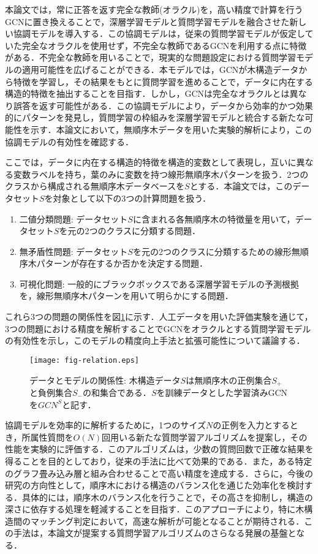 本論文では，常に正答を返す完全な教師(オラクル)を，高い精度で計算を行うGCNに置き換えることで，深層学習モデルと質問学習モデルを融合させた新しい協調モデルを導入する．この協調モデルは，従来の質問学習モデルが仮定していた完全なオラクルを使用せず，不完全な教師であるGCNを利用する点に特徴がある．不完全な教師を用いることで，現実的な問題設定における質問学習モデルの適用可能性を広げることができる．本モデルでは，GCNが木構造データから特徴を学習し，その結果をもとに質問学習を進めることで，データに内在する構造的特徴を抽出することを目指す．しかし，GCNは完全なオラクルとは異なり誤答を返す可能性がある．この協調モデルにより，データから効率的かつ効果的にパターンを発見し，質問学習の枠組みを深層学習モデルと統合する新たな可能性を示す．本論文において，無順序木データを用いた実験的解析により，この協調モデルの有効性を確認する．

ここでは，データに内在する構造的特徴を構造的変数として表現し，互いに異なる変数ラベルを持ち，葉のみに変数を持つ線形無順序木パターンを扱う．2つのクラスから構成される無順序木データベースを$S$とする．本論文では，このデータセット$S$を対象として以下の3つの計算問題を扱う．
\begin{enumerate}
  \item[(1)] 二値分類問題: データセット$S$に含まれる各無順序木の特徴量を用いて，データセット$S$を元の2つのクラスに分類する問題．
  \item[(2)] 無矛盾性問題: データセット$S$を元の2つのクラスに分類するための線形無順序木パターンが存在するか否かを決定する問題．
  \item[(3)] 可視化問題: 一般的にブラックボックスである深層学習モデルの予測根拠を，線形無順序木パターンを用いて明らかにする問題．
\end{enumerate}
これら3つの問題の関係性を図\ref{fig:relation}に示す．人工データを用いた評価実験を通じて，3つの問題における精度を解析することでGCNをオラクルとする質問学習モデルの有効性を示し，このモデルの精度向上手法と拡張可能性について議論する．

\begin{figure}[tb]
  \centering
  \texttt{[image: fig-relation.eps]}
  \caption{データとモデルの関係性: 木構造データ$S$は無順序木の正例集合$S_+$と負例集合$S_-$の和集合である．$S$を訓練データとした学習済みGCNを$GCN^S$と記す．}\label{fig:relation}
\end{figure}

協調モデルを効率的に解析するために，1つのサイズ$N$の正例を入力とするとき，所属性質問を$O(N)$回用いる新たな質問学習アルゴリズムを提案し，その性能を実験的に評価する．このアルゴリズムは，少数の質問回数で正確な結果を得ることを目的としており，従来の手法に比べて効果的である．また，ある特定のグラフ畳み込み層と組み合わせることで高い精度を達成する．さらに，今後の研究の方向性として，順序木における構造のバランス化を通じた効率化を検討する．具体的には，順序木のバランス化を行うことで，その高さを抑制し，構造の深さに依存する処理を軽減することを目指す．このアプローチにより，特に木構造間のマッチング判定において，高速な解析が可能となることが期待される．この手法は，本論文が提案する質問学習アルゴリズムのさらなる発展の基盤となる．

